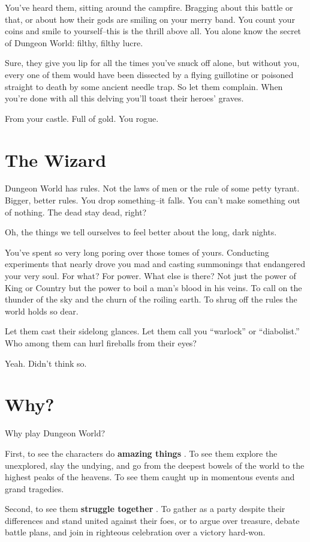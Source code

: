  You've heard them, sitting around the campfire. Bragging about this battle or that, or about how their gods are smiling on your merry band. You count your coins and smile to yourself--this is the thrill above all. You alone know the secret of Dungeon World: filthy, filthy lucre.


 Sure, they give you lip for all the times you've snuck off alone, but without you, every one of them would have been dissected by a flying guillotine or poisoned straight to death by some ancient needle trap. So let them complain. When you're done with all this delving you'll toast their heroes' graves.


 From your castle. Full of gold. You rogue.
\section*{The Wizard}


 Dungeon World has rules. Not the laws of men or the rule of some petty tyrant. Bigger, better rules. You drop something--it falls. You can't make something out of nothing. The dead stay dead, right?


 Oh, the things we tell ourselves to feel better about the long, dark nights.


 You've spent so very long poring over those tomes of yours. Conducting experiments that nearly drove you mad and casting summonings that endangered your very soul. For what? For power. What else is there? Not just the power of King or Country but the power to boil a man's blood in his veins. To call on the thunder of the sky and the churn of the roiling earth. To shrug off the rules the world holds so dear.


 Let them cast their sidelong glances. Let them call you ``warlock'' or ``diabolist.'' Who among them can hurl fireballs from their eyes?


 Yeah. Didn't think so.
\section*{Why?}


 Why play Dungeon World?


 First, to see the characters do \textbf{amazing things}
. To see them explore the unexplored, slay the undying, and go from the deepest bowels of the world to the highest peaks of the heavens. To see them caught up in momentous events and grand tragedies.


 Second, to see them \textbf{struggle together}
. To gather as a party despite their differences and stand united against their foes, or to argue over treasure, debate battle plans, and join in righteous celebration over a victory hard-won.


